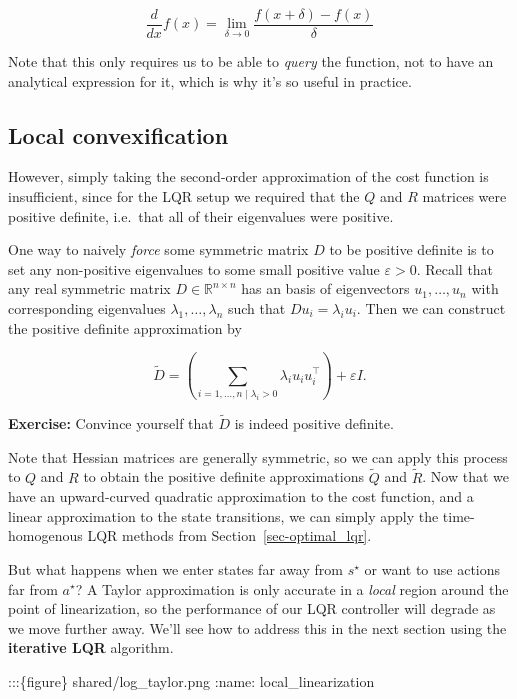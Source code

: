 \documentclass[
  letterpaper,
  DIV=11,
  numbers=noendperiod]{scrreprt}
\theoremstyle{plain}
\theoremstyle{plain}
\theoremstyle{definition}
\theoremstyle{definition}
\theoremstyle{remark}
\begin{document}
\[
\frac{d}{dx} f(x) = \lim_{\delta \to 0} \frac{f(x + \delta) - f(x)}{\delta}
\]

Note that this only requires us to be able to \emph{query} the function,
not to have an analytical expression for it, which is why it's so useful
in practice.

\subsection{Local convexification}\label{local-convexification}

However, simply taking the second-order approximation of the cost
function is insufficient, since for the LQR setup we required that the
\(Q\) and \(R\) matrices were positive definite, i.e.~that all of their
eigenvalues were positive.

One way to naively \emph{force} some symmetric matrix \(D\) to be
positive definite is to set any non-positive eigenvalues to some small
positive value \(\varepsilon > 0\). Recall that any real symmetric
matrix \(D \in \mathbb{R}^{n \times n}\) has an basis of eigenvectors
\(u_1, \dots, u_n\) with corresponding eigenvalues
\(\lambda_1, \dots, \lambda_n\) such that \(D u_i = \lambda_i u_i\).
Then we can construct the positive definite approximation by

\[
\widetilde{D} = \left( \sum_{i=1, \dots, n \mid \lambda_i > 0} \lambda_i u_i u_i^\top \right) + \varepsilon I.
\]

\textbf{Exercise:} Convince yourself that \(\widetilde{D}\) is indeed
positive definite.

Note that Hessian matrices are generally symmetric, so we can apply this
process to \(Q\) and \(R\) to obtain the positive definite
approximations \(\widetilde{Q}\) and \(\widetilde{R}\). Now that we have
an upward-curved quadratic approximation to the cost function, and a
linear approximation to the state transitions, we can simply apply the
time-homogenous LQR methods from Section~\ref{sec-optimal_lqr}.

But what happens when we enter states far away from \(s^\star\) or want
to use actions far from \(a^\star\)? A Taylor approximation is only
accurate in a \emph{local} region around the point of linearization, so
the performance of our LQR controller will degrade as we move further
away. We'll see how to address this in the next section using the
\textbf{iterative LQR} algorithm.

:::\{figure\} shared/log\_taylor.png :name: local\_linearization
\end{document}
